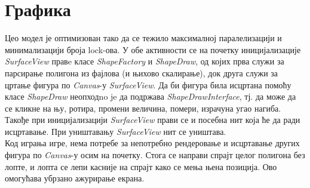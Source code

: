 \section{Графика}


 Цео модел је оптимизован тако да се тежило максималној паралелизацији и минимализацији броја lock-ова. У обе активности се на почетку иницијализације \emph{SurfaceView} правe класе \emph{ShapeFactory} и \emph{ShapeDraw}, од којих прва служи за парсирање полигона из фајлова (и њихово скалирање), док друга служи за цртање фигура по \emph{Canvas}-у \emph{SurfaceView}. Да би фигура била исцртана помоћу класе \emph{ShapeDraw} неопходno je да подржава \emph{ShapeDrawInterface}, тј. да може да се кликне на њу, ротира, промени величина, помери, израчуна угао нагиба. Такође при иницијализацији \emph{SurfaceView} прави се и посебна нит која ће да ради исцртавање. При уништавању \emph{SurfaceView} нит се уништава.
\\ \indent
Код играња игре, нема потребе за непотребно рендеровање и исцртавање других фигура по \emph{Canvas}-у осим на почетку. Стога се направи спрајт целог полигона без лопте, и лопта се лепи касније на спрајт како се мења њена позиција. Ово омогућава убрзано ажурирање екрана.
